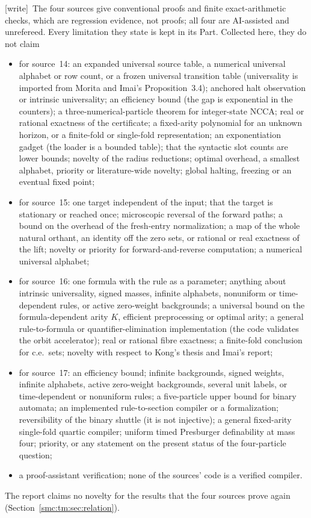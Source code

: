 \documentclass[11pt,letterpaper]{article}
\numberwithin{equation}{section}
\theoremstyle{definition}
\theoremstyle{remark}
\newcommand{\wtag}{\textup{[write]}}
\begin{document}
\wtag\ The four sources give conventional proofs and finite exact-arithmetic checks, which are regression evidence, not proofs; all four are AI-assisted and unrefereed. Every limitation they state is kept in its Part. Collected here, they do not claim
\begin{itemize}
\item for source~14: an expanded universal source table, a numerical universal alphabet or row count, or a frozen universal transition table (universality is imported from Morita and Imai's Proposition~3.4); anchored halt observation or intrinsic universality; an efficiency bound (the gap is exponential in the counters); a three-numerical-particle theorem for integer-state NCCA; real or rational exactness of the certificate; a fixed-arity polynomial for an unknown horizon, or a finite-fold or single-fold representation; an exponentiation gadget (the loader is a bounded table); that the syntactic slot counts are lower bounds; novelty of the radius reductions; optimal overhead, a smallest alphabet, priority or literature-wide novelty; global halting, freezing or an eventual fixed point;
\item for source~15: one target independent of the input; that the target is stationary or reached once; microscopic reversal of the forward paths; a bound on the overhead of the fresh-entry normalization; a map of the whole natural orthant, an identity off the zero sets, or rational or real exactness of the lift; novelty or priority for forward-and-reverse computation; a numerical universal alphabet;
\item for source~16: one formula with the rule as a parameter; anything about intrinsic universality, signed masses, infinite alphabets, nonuniform or time-dependent rules, or active zero-weight backgrounds; a universal bound on the formula-dependent arity $K$, efficient preprocessing or optimal arity; a general rule-to-formula or quantifier-elimination implementation (the code validates the orbit accelerator); real or rational fibre exactness; a finite-fold conclusion for c.e.\ sets; novelty with respect to Kong's thesis and Imai's report;
\item for source~17: an efficiency bound; infinite backgrounds, signed weights, infinite alphabets, active zero-weight backgrounds, several unit labels, or time-dependent or nonuniform rules; a five-particle upper bound for binary automata; an implemented rule-to-section compiler or a formalization; reversibility of the binary shuttle (it is not injective); a general fixed-arity single-fold quartic compiler; uniform timed Presburger definability at mass four; priority, or any statement on the present status of the four-particle question;
\item a proof-assistant verification; none of the sources' code is a verified compiler.
\end{itemize}
The report claims no novelty for the results that the four sources prove again (Section~\ref{smc:tm:sec:relation}).
\end{document}
